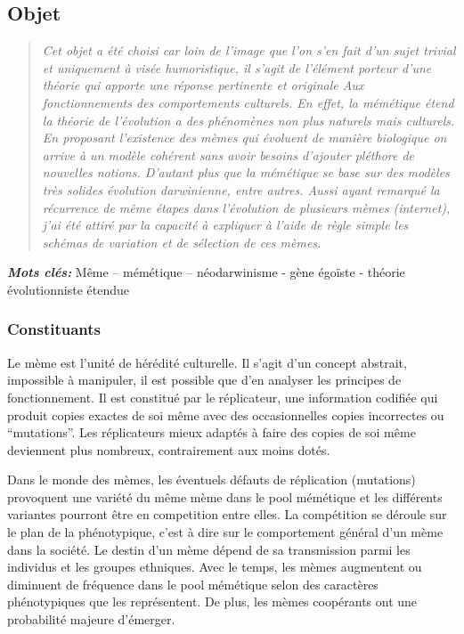 \documentclass[12pt]{article}
\begin{document}
\subsection{Objet}

\begin{quote}
	\emph{Cet objet a été choisi car loin de l'image que l'on s'en fait d'un
		sujet trivial et uniquement à visée humoristique, il s'agit de l'élément
		porteur d'une théorie qui apporte une réponse pertinente et originale
		Aux fonctionnements des comportements culturels. En effet, la mémétique
		étend la théorie de l'évolution a des phénomènes non plus naturels mais
		culturels. En proposant l'existence des mèmes qui évoluent de manière
		biologique on arrive à un modèle cohérent sans avoir besoins d'ajouter
		pléthore de nouvelles notions. D'autant plus que la mémétique se base
		sur des modèles très solides évolution darwinienne, entre autres. 	\cite{claidiere:tel-00431055} Aussi ayant remarqué la récurrence de même étapes dans l'évolution de		plusieurs mèmes (internet), j'ai été attiré par la capacité à expliquer
		à l'aide de règle simple les schémas de variation et de sélection de ces
		mèmes.}
\end{quote}

\emph{\textbf{Mots clés:}} Même -- mémétique -- néodarwinisme - gène
égoïste - théorie évolutionniste étendue

\subsubsection{Constituants}

Le mème est l'unité de hérédité culturelle. Il s'agit d'un concept
abstrait, impossible à manipuler, il est possible que d'en analyser les
principes de fonctionnement.\cite{definition} Il est constitué par le réplicateur, une
information codifiée qui produit copies exactes de soi même avec des
occasionnelles copies incorrectes ou ``mutations''. Les réplicateurs
mieux adaptés à faire des copies de soi même deviennent plus nombreux,
contrairement aux moins dotés.

Dans le monde des mèmes, les éventuels défauts de réplication
(mutations) provoquent une variété du même mème dans le pool mémétique
et les différents variantes pourront être en competition entre elles. La
compétition se déroule sur le plan de la phénotypique, c'est à dire sur
le comportement général d'un mème dans la société. Le destin d'un mème
dépend de sa transmission parmi les individus et les groupes ethniques. \cite{gene}
Avec le temps, les mèmes augmentent ou diminuent de fréquence dans le
pool mémétique selon des caractères phénotypiques que les représentent.
De plus, les mèmes coopérants ont une probabilité majeure d'émerger.
\end{document}
